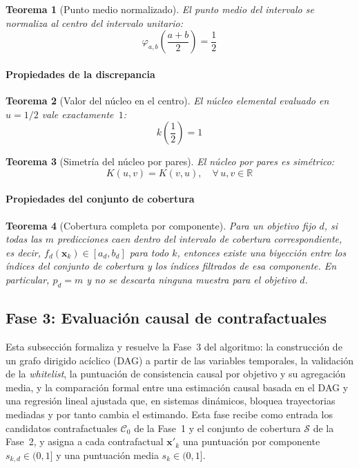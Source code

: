 \documentclass[12pt]{report} %
\newtheorem{theorem}{Teorema}
\begin{document}
\begin{theorem}[Punto medio normalizado]
    El punto medio del intervalo se normaliza al centro del intervalo unitario:
    $$\varphi_{a,b}\!\left(\frac{a+b}{2}\right) = \frac{1}{2}$$
\end{theorem}

\paragraph{Propiedades de la discrepancia}

\begin{theorem}[Valor del núcleo en el centro]
    El núcleo elemental evaluado en $u = 1/2$ vale exactamente~$1$:
    $$k\!\left(\frac{1}{2}\right) = 1$$
\end{theorem}

\begin{theorem}[Simetría del núcleo por pares]
    El núcleo por pares es simétrico:
    $$K(u, v) = K(v, u), \quad \forall\, u, v \in \mathbb{R}$$
\end{theorem}

\paragraph{Propiedades del conjunto de cobertura}

\begin{theorem}[Cobertura completa por componente]
    Para un objetivo fijo $d$, si todas las $m$ predicciones caen dentro del intervalo de cobertura correspondiente, es decir, $f_d(\mathbf{x}_k) \in [a_d, b_d]$ para todo $k$, entonces existe una biyección entre los índices del conjunto de cobertura y los índices filtrados de esa componente. En particular, $p_d = m$ y no se descarta ninguna muestra para el objetivo $d$.
\end{theorem}

\subsection{Fase 3: Evaluación causal de contrafactuales}

Esta subsección formaliza y resuelve la Fase~3 del algoritmo: la construcción de un grafo dirigido acíclico (DAG) a partir de las variables temporales, la validación de la \textit{whitelist}, la puntuación de consistencia causal por objetivo y su agregación media, y la comparación formal entre una estimación causal basada en el DAG y una regresión lineal ajustada que, en sistemas dinámicos, bloquea trayectorias mediadas y por tanto cambia el estimando. Esta fase recibe como entrada los candidatos contrafactuales $\mathcal{C}_0$ de la Fase~1 y el conjunto de cobertura $\mathcal{S}$ de la Fase~2, y asigna a cada contrafactual $\mathbf{x}'_k$ una puntuación por componente $s_{k,d} \in (0, 1]$ y una puntuación media $s_k \in (0, 1]$.
\end{document}
